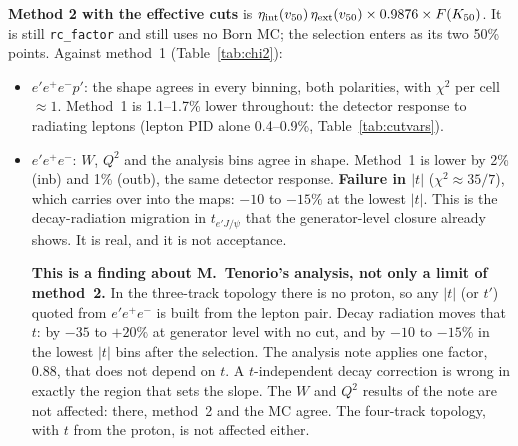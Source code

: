 \documentclass[11pt]{article}
\begin{document}
\textbf{Method 2 with the effective cuts} is
$\eta_{\rm int}(v_{50})\,\eta_{\rm ext}(v_{50})\times0.9876\times F(K_{50})$. It is still \texttt{rc\_factor} and still uses no Born
MC; the selection enters as its two 50\% points. Against method~1 (Table~\ref{tab:chi2}):
\begin{itemize}
\item $e'e^+e^-p'$: the shape agrees in every binning, both polarities, with $\chi^2$ per cell $\approx1$. Method~1 is
1.1--1.7\% lower throughout: the detector response to radiating leptons (lepton PID alone 0.4--0.9\%, Table~\ref{tab:cutvars}).
\item $e'e^+e^-$: $W$, $Q^2$ and the analysis bins agree in shape. Method~1 is lower by 2\% (inb) and 1\% (outb), the same
detector response. \textbf{Failure in $|t|$} ($\chi^2\approx35/7$), which carries
over into the maps: $-10$ to $-15\%$ at the lowest $|t|$. This is the decay-radiation migration in $t_{e'J/\psi}$ that
the generator-level closure already shows. It is real, and it is not acceptance.

\textbf{This is a finding about M.~Tenorio's analysis, not only a limit of method~2.} In the three-track topology there is no
proton, so any $|t|$ (or $t'$) quoted from $e'e^+e^-$ is built from the lepton pair. Decay radiation moves that $t$:
by $-35$ to $+20\%$ at generator level with no cut, and by $-10$ to $-15\%$ in the lowest $|t|$ bins after the
selection. The analysis note applies one factor, $0.88$, that does not depend on $t$. A $t$-independent decay correction is
wrong in exactly the region that sets the slope. The $W$ and $Q^2$ results of the note are not affected: there, method~2 and the
MC agree. The four-track topology, with $t$ from the proton, is not affected either.
\end{itemize}
\begin{table}[H]\centering\small

\caption{Method 1 against method 2 at effective cuts: $\chi^2$ over cells (statistical error of method 1 only) and the
error-weighted mean deviation.}\label{tab:chi2}
\end{table}
\end{document}
